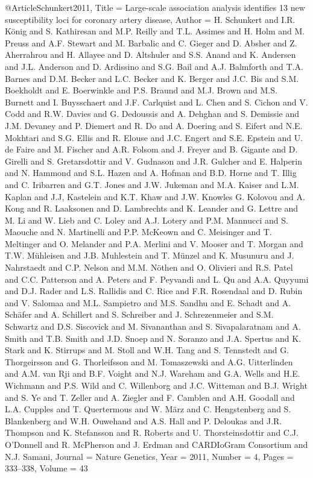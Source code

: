 @Article{Schunkert2011,
  Title                    = {Large-scale association analysis identifies 13 new susceptibility loci for coronary artery disease},
  Author                   = {H. Schunkert and I.R. König and S. Kathiresan and M.P. Reilly and T.L. Assimes and H. Holm and M. Preuss and A.F. Stewart and M. Barbalic and C. Gieger and D. Absher and Z. Aherrahrou and H. Allayee and D. Altshuler and S.S. Anand and K. Andersen and J.L. Anderson and D. Ardissino and S.G. Bail and A.J. Balmforth and T.A. Barnes and D.M. Becker and L.C. Becker and K. Berger and J.C. Bis and S.M. Boekholdt and E. Boerwinkle and P.S. Braund and M.J. Brown and M.S. Burnett and I. Buysschaert and J.F. Carlquist and L. Chen and S. Cichon and V. Codd and R.W. Davies and G. Dedoussis and A. Dehghan and S. Demissie and J.M. Devaney and P. Diemert and R. Do and A. Doering and S. Eifert and N.E. Mokhtari and S.G. Ellis and R. Elouse and J.C. Engert and S.E. Epstein and U. de Faire and M. Fischer and A.R. Folsom and J. Freyer and B. Gigante and D. Girelli and S. Gretarsdottir and V. Gudnason and J.R. Gulcher and E. Halperin and N. Hammond and S.L. Hazen and A. Hofman and B.D. Horne and T. Illig and C. Iribarren and G.T. Jones and J.W. Jukeman and M.A. Kaiser and L.M. Kaplan and J.J, Kastelein and K.T. Khaw and J.W. Knowles G. Kolovou and A. Kong and R. Laaksonen and D. Lambrechts and K. Leander and G. Lettre and M. Li and W. Lieb and C. Loley and A.J. Lotery and P.M. Mannucci and S. Maouche and N. Martinelli and P.P. McKeown and C. Meisinger and T. Meltinger and O. Melander and P.A. Merlini and V. Mooser and T. Morgan and T.W. Mühleisen and J.B. Muhlestein and T. Münzel and K. Musunuru and J. Nahrstaedt and C.P. Nelson and M.M. Nöthen and O. Olivieri and R.S. Patel and C.C. Patterson and A. Peters and F. Peyvandi and L. Qu and A.A. Quyyumi and D.J. Rader and L.S. Rallidis and C. Rice and F.R. Rosendaal and D. Rubin and V. Salomaa and M.L. Sampietro and M.S. Sandhu and E. Schadt and A. Schäfer and A. Schillert and S. Schreiber and J. Schrezenmeier and S.M. Schwartz and D.S. Siscovick and M. Sivananthan and S. Sivapalaratnam and A. Smith and T.B. Smith and J.D. Snoep and N. Soranzo and J.A. Spertus and K. Stark and K. Stirrups and M. Stoll and W.H. Tang and S. Tennstedt and G. Thorgeirsson and G. Thorleifsson and M. Tomaszewski and A.G. Uitterlinden and A.M. van Rji and B.F. Voight and N.J. Wareham and G.A. Wells and H.E. Wichmann and P.S. Wild and C. Willenborg and J.C. Witteman and B.J. Wright and S. Ye and T. Zeller and A. Ziegler and F. Camblen and A.H. Goodall and L.A. Cupples and T. Quertermous and W. März and C. Hengstenberg and S. Blankenberg and W.H. Ouwehand and A.S. Hall and P. Deloukas and J.R. Thompson and K. Stefansson and R. Roberts and U. Thorsteinsdottir and C.J. O'Donnell and R. McPherson and J. Erdman and {CARDIoGram Consortium} and N.J. Samani},
  Journal                  = {Nature Genetics},
  Year                     = {2011},
  Number                   = {4},
  Pages                    = {333--338},
  Volume                   = {43}
}

